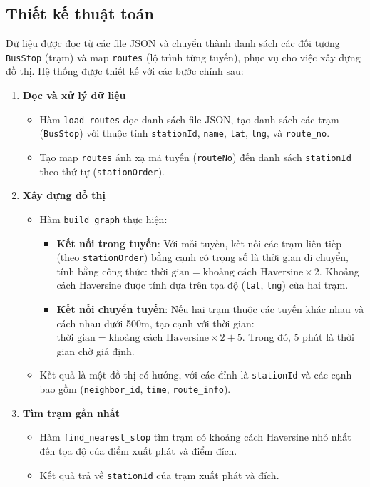 \documentclass[a4paper,12pt]{article}
\begin{document}
\subsection{Thiết kế thuật toán}
Dữ liệu được đọc từ các file JSON và chuyển thành danh sách các đối tượng \texttt{BusStop} (trạm) và map \texttt{routes} (lộ trình từng tuyến), phục vụ cho việc xây dựng đồ thị. Hệ thống được thiết kế với các bước chính sau:

\begin{enumerate}
    \item \textbf{Đọc và xử lý dữ liệu}
    \begin{itemize}
        \item Hàm \texttt{load\_routes} đọc danh sách file JSON, tạo danh sách các trạm (\texttt{BusStop}) với thuộc tính \texttt{stationId}, \texttt{name}, \texttt{lat}, \texttt{lng}, và \texttt{route\_no}.
        \item Tạo map \texttt{routes} ánh xạ mã tuyến (\texttt{routeNo}) đến danh sách \texttt{stationId} theo thứ tự (\texttt{stationOrder}).
    \end{itemize}
    
    \item \textbf{Xây dựng đồ thị}
    \begin{itemize}
        \item Hàm \texttt{build\_graph} thực hiện:
        \begin{itemize}
            \item \textbf{Kết nối trong tuyến}: Với mỗi tuyến, kết nối các trạm liên tiếp (theo \texttt{stationOrder}) bằng cạnh có trọng số là thời gian di chuyển, tính bằng công thức: $\text{thời gian} = \text{khoảng cách Haversine} \times 2$. Khoảng cách Haversine được tính dựa trên tọa độ (\texttt{lat}, \texttt{lng}) của hai trạm.
            \item \textbf{Kết nối chuyển tuyến}: Nếu hai trạm thuộc các tuyến khác nhau và cách nhau dưới 500m, tạo cạnh với thời gian: $\text{thời gian} = \text{khoảng cách Haversine} \times 2 + 5$. Trong đó, 5 phút là thời gian chờ giả định.
        \end{itemize}
        \item Kết quả là một đồ thị có hướng, với các đỉnh là \texttt{stationId} và các cạnh bao gồm (\texttt{neighbor\_id}, \texttt{time}, \texttt{route\_info}).
    \end{itemize}
    
    \item \textbf{Tìm trạm gần nhất}
    \begin{itemize}
        \item Hàm \texttt{find\_nearest\_stop} tìm trạm có khoảng cách Haversine nhỏ nhất đến tọa độ của điểm xuất phát và điểm đích.
        \item Kết quả trả về \texttt{stationId} của trạm xuất phát và đích.
    \end{itemize}
    

\end{enumerate}
\end{document}
